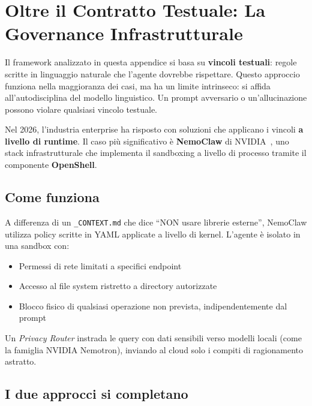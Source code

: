 \section{Oltre il Contratto Testuale: La Governance Infrastrutturale}

Il framework analizzato in questa appendice si basa su \textbf{vincoli testuali}: regole scritte in linguaggio naturale che l'agente dovrebbe rispettare. Questo approccio funziona nella maggioranza dei casi, ma ha un limite intrinseco: si affida all'autodisciplina del modello linguistico. Un prompt avversario o un'allucinazione possono violare qualsiasi vincolo testuale.

Nel 2026, l'industria enterprise ha risposto con soluzioni che applicano i vincoli \textbf{a livello di runtime}. Il caso più significativo è \textbf{NemoClaw} di NVIDIA~\cite{nvidia:nemoclaw,nvidia:sandbox}, uno stack infrastrutturale che implementa il sandboxing a livello di processo tramite il componente \textbf{OpenShell}.

\subsection{Come funziona}

A differenza di un \texttt{\_CONTEXT.md} che dice ``NON usare librerie esterne'', NemoClaw utilizza policy scritte in YAML applicate a livello di kernel. L'agente è isolato in una sandbox con:

\begin{itemize}
  \item Permessi di rete limitati a specifici endpoint
  \item Accesso al file system ristretto a directory autorizzate
  \item Blocco fisico di qualsiasi operazione non prevista, indipendentemente dal prompt
\end{itemize}

Un \textit{Privacy Router} instrada le query con dati sensibili verso modelli locali (come la famiglia NVIDIA Nemotron), inviando al cloud solo i compiti di ragionamento astratto.

\subsection{I due approcci si completano}

